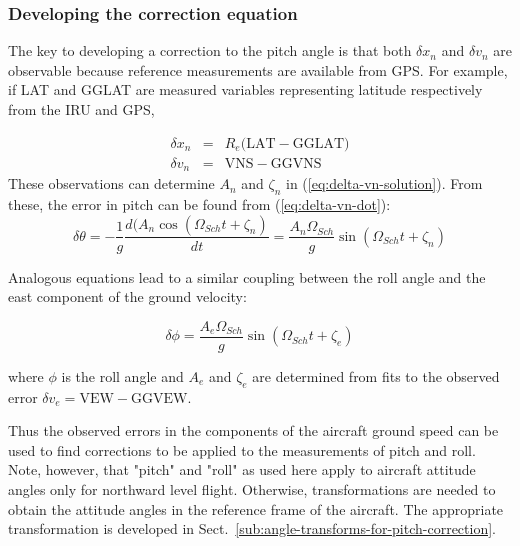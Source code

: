 \documentclass[12pt,twoside,english]{article}\usepackage[]{graphicx}\usepackage[]{color}
\begin{document}
\subsubsection{Developing the correction equation}

The key to developing a correction to the pitch angle is that both $\delta x_{n}$ and $\delta v_{n}$ are observable because reference measurements are available from GPS. For example, if LAT and GGLAT are measured variables representing latitude respectively from the IRU and GPS,

\begin{eqnarray}
\delta x_{n} & = & R_{e}(\mathrm{LAT-GGLAT)}\nonumber \\ 
\delta v_{n} & = & \mathrm{VNS-GGVNS}\label{eq:observed-errors} 
\end{eqnarray}
These observations can determine $A_{n}$ and $\zeta_{n}$ in (\ref{eq:delta-vn-solution}). From these, the error in pitch can be found from (\ref{eq:delta-vn-dot}):\\ 
\begin{equation}
\delta\theta=-\frac{1}{g}\frac{d(A_{n}\cos(\Omega_{Sch}t+\zeta_{n})}{dt}=\frac{A_{n}\Omega_{Sch}}{g}\sin(\Omega_{Sch}t+\zeta_{n})\label{eq:solution-delta-theta} 
\end{equation}


Analogous equations lead to a similar coupling between the roll angle and the east component of the ground velocity: 

\begin{equation}
\delta\phi=\frac{A_{e}\Omega_{Sch}}{g}\sin(\Omega_{Sch}t+\zeta_{e})\label{eq:solution-delta-phi} 
\end{equation}


where $\phi$ is the roll angle and $A_{e}$ and $\zeta_{e}$ are determined from fits to the observed error $\delta v_{e}=\mathrm{VEW-GGVEW}$. 

Thus the observed errors in the components of the aircraft ground  speed can be used to find corrections to be applied to the measurements of pitch and roll. Note, however, that "pitch" and "roll" as used here apply to aircraft attitude angles only for northward level flight. Otherwise, transformations are needed to obtain the attitude angles in the reference frame of the aircraft. The appropriate transformation is developed in Sect.~\ref{sub:angle-transforms-for-pitch-correction}.
\end{document}
